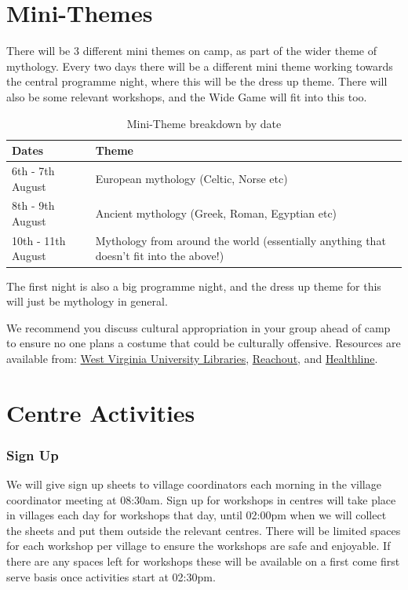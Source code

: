 \documentclass[a4paper, 11pt]{report}
\newcommand{\nl}{\newline}
\begin{document}
\section{Mini-Themes}
There will be 3 different mini themes on camp, as part of the wider theme of mythology. Every two days there will be a different mini theme working towards the central programme night, where this will be the dress up theme. There will also be some relevant workshops, and the Wide Game will fit into this too.

\begin{table}[H]
    \centering
    {\RaggedRight
    \begin{tabular}{p{} p{}}
        \textbf{Dates} & \textbf{Theme}\\
        \hline
        6th - 7th August & European mythology (Celtic, Norse etc)\\
        \hline
        8th - 9th August & Ancient mythology (Greek, Roman, Egyptian etc)\\
        \hline
        10th - 11th August & Mythology from around the world (essentially anything that doesn't fit into the above!)\\
        \hline
    \end{tabular}
    }%
    \caption{Mini-Theme breakdown by date}
\end{table}
The first night is also a big programme night, and the dress up theme for this will just be mythology in general. \nl

We recommend you discuss cultural appropriation in your group ahead of camp to ensure no one plans a costume that could be culturally offensive. Resources are available from: \href{https://libguides.wvu.edu/Halloween/costumes}{West Virginia University Libraries}, \href{https://au.reachout.com/articles/why-cultural-appropriation-isnt-cool}{Reachout}, and \href{https://www.healthline.com/health/cultural-appropriation#in-pop-culture}{Healthline}. 

\section{Centre Activities}
\subsubsection{Sign Up}
We will give sign up sheets to village coordinators each morning in the village coordinator meeting at 08:30am. Sign up for workshops in centres will take place in villages each day for workshops that day, until 02:00pm when we will collect the sheets and put them outside the relevant centres. There will be limited spaces for each workshop per village to ensure the workshops are safe and enjoyable. If there are any spaces left for workshops these will be available on a first come first serve basis once activities start at 02:30pm.
\end{document}
